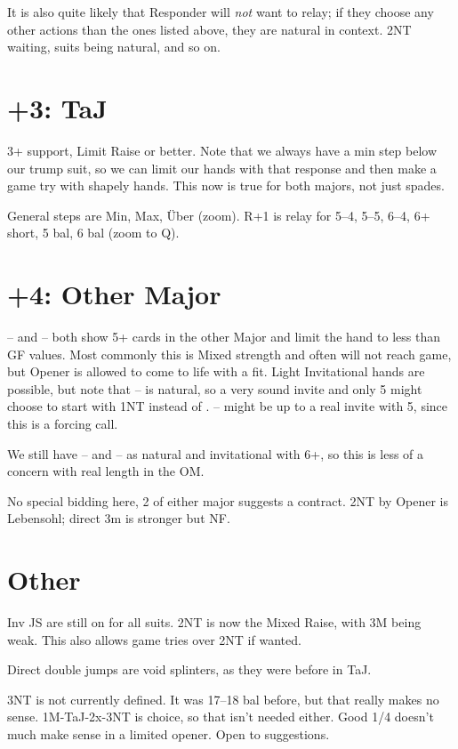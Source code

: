 \documentclass[tom-ari]{subfile}
\begin{document}
It is also quite likely that Responder will \textit{not} want to relay; if they choose any other actions than the ones listed above, they are natural in context.  2NT waiting, suits being natural, and so on.

\section{+3: TaJ}

3+ support, Limit Raise or better.  Note that we always have a min step below our trump suit, so we can limit our hands with that response and then make a game try with shapely hands.  This now is true for both majors, not just spades.

General steps are Min, Max, \"Uber (zoom). R+1 is relay for 5--4, 5--5, 6--4, 6+ short, 5 bal, 6 bal (zoom to Q).

\section{+4: Other Major}

-- and -- both show 5+ cards in the other Major and limit the hand to less than GF values.  Most commonly this is Mixed strength and often will not reach game, but Opener is allowed to come to life with a fit.  Light Invitational hands are possible, but note that -- is natural, so a very sound invite and only 5  might choose to start with 1NT instead of .  -- might be up to a real invite with 5, since this is a forcing call.

We still have -- and -- as natural and invitational with 6+, so this is less of a concern with real length in the OM.  

No special bidding here, 2 of either major suggests a contract.  2NT by Opener is Lebensohl; direct 3m is stronger but NF.

\section{Other}

Inv JS are still on for all suits.  2NT is now the Mixed Raise, with 3M being weak.  This also allows game tries over 2NT if wanted.

Direct double jumps are void splinters, as they were before in TaJ.  

3NT is not currently defined.  It was 17--18 bal before, but that really makes no sense. 1M-TaJ-2x-3NT is choice, so that isn't needed either.  Good 1/4 doesn't much make sense in a limited opener.  Open to suggestions.
\end{document}
